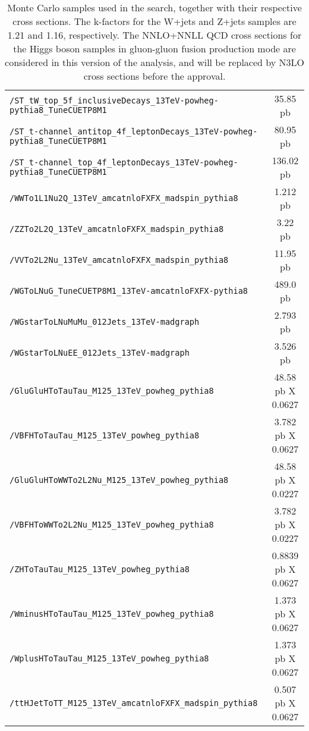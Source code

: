 \begin{table}[!hbpt]
\begin{center}
{\begin{tabular}{|l|c|}
\texttt{/ST\_tW\_top\_5f\_inclusiveDecays\_13TeV-powheg-pythia8\_TuneCUETP8M1} & 35.85 pb\\
\texttt{/ST\_t-channel\_antitop\_4f\_leptonDecays\_13TeV-powheg-pythia8\_TuneCUETP8M1} & 80.95 pb\\
\texttt{/ST\_t-channel\_top\_4f\_leptonDecays\_13TeV-powheg-pythia8\_TuneCUETP8M1} & 136.02 pb\\
\texttt{/WWTo1L1Nu2Q\_13TeV\_amcatnloFXFX\_madspin\_pythia8} & 1.212 pb\\
\texttt{/ZZTo2L2Q\_13TeV\_amcatnloFXFX\_madspin\_pythia8} & 3.22 pb\\
\texttt{/VVTo2L2Nu\_13TeV\_amcatnloFXFX\_madspin\_pythia8} & 11.95 pb\\
\texttt{/WGToLNuG\_TuneCUETP8M1\_13TeV-amcatnloFXFX-pythia8} & 489.0 pb \\
\texttt{/WGstarToLNuMuMu\_012Jets\_13TeV-madgraph} & 2.793 pb \\
\texttt{/WGstarToLNuEE\_012Jets\_13TeV-madgraph} & 3.526 pb \\
\texttt{/GluGluHToTauTau\_M125\_13TeV\_powheg\_pythia8}   & 48.58 pb X 0.0627 \\
\texttt{/VBFHToTauTau\_M125\_13TeV\_powheg\_pythia8}   & 3.782 pb X 0.0627 \\
\texttt{/GluGluHToWWTo2L2Nu\_M125\_13TeV\_powheg\_pythia8}& 48.58 pb X 0.0227 \\
\texttt{/VBFHToWWTo2L2Nu\_M125\_13TeV\_powheg\_pythia8}& 3.782 pb X 0.0227 \\
\texttt{/ZHToTauTau\_M125\_13TeV\_powheg\_pythia8} & 0.8839 pb X 0.0627\\
\texttt{/WminusHToTauTau\_M125\_13TeV\_powheg\_pythia8} & 1.373 pb X 0.0627\\
\texttt{/WplusHToTauTau\_M125\_13TeV\_powheg\_pythia8} & 1.373 pb X 0.0627\\
\texttt{/ttHJetToTT\_M125\_13TeV\_amcatnloFXFX\_madspin\_pythia8} & 0.507 pb  X 0.0627 \\
\hline
\end{tabular}
} %
\end{center}
\caption{Monte Carlo samples used in the search, together with their respective cross sections. The k-factors for the
W+jets and Z+jets samples are 1.21 and 1.16, respectively. The NNLO+NNLL QCD cross sections for the Higgs boson samples
in gluon-gluon fusion production mode are considered in this version of the analysis, and will be replaced
by N3LO cross sections before the approval.}
\label{tab:mcsamples}
\end{table}



